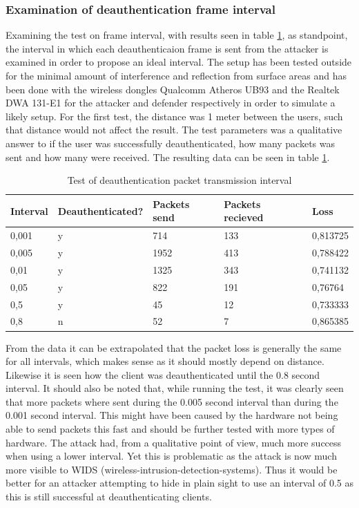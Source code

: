 \subsubsection{Examination of deauthentication frame interval}
Examining the test on frame interval, with results seen in table \ref{Examination of deauthentication frame interval}, as standpoint, the interval in which each deauthenticaion frame is sent from the attacker is examined in order to propose an ideal interval. The setup has been tested outside for the minimal amount of interference and reflection from surface areas and has been done with the wireless dongles Qualcomm Atheros UB93 and the Realtek DWA 131-E1 for the attacker and defender respectively in order to simulate a likely setup. For the first test, the distance was 1 meter between the users, such that distance would not affect the result. The test parameters was a qualitative answer to if the user was successfully deauthenticated, how many packets was sent and how many were received. The resulting data can be seen in table \ref{Examination of deauthentication frame interval}.

\begin{table}[!htbp]
\centering
\begin{tabular}{lllll}
\hline
Interval & Deauthenticated? & Packets send & Packets recieved & Loss     \\ \hline
0,001    & y                & 714          & 133              & 0,813725 \\
0,005    & y                & 1952         & 413              & 0,788422 \\
0,01     & y                & 1325         & 343              & 0,741132 \\
0,05     & y                & 822          & 191              & 0,76764  \\
0,5      & y                & 45           & 12               & 0,733333 \\
0,8      & n                & 52           & 7                & 0,865385 \\ \hline
\end{tabular}
\caption{Test of deauthentication packet transmission interval}
\label{Examination of deauthentication frame interval}
\end{table}

From the data it can be extrapolated that the packet loss is generally the same for all intervals, which makes sense as it should mostly depend on distance. Likewise it is seen how the client was deauthenticated until the 0.8 second interval. It should also be noted that, while running the test, it was clearly seen that more packets where sent during the 0.005 second interval than during the 0.001 second interval. This might have been caused by the hardware not being able to send packets this fast and should be further tested with more types of hardware. The attack had, from a qualitative point of view, much more success when using a lower interval. Yet this is problematic as the attack is now much more visible to WIDS (wireless-intrusion-detection-systems). Thus it would be better for an attacker attempting to hide in plain sight to use an interval of 0.5 as this is still successful at deauthenticating clients.


